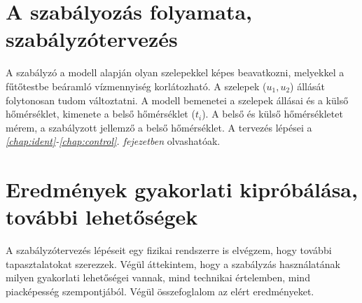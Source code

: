 \section{A szabályozás folyamata, szabályzótervezés}
A szabályzó a  modell alapján olyan szelepekkel képes beavatkozni, melyekkel a fűtőtestbe beáramló vízmennyiség  korlátozható. A szelepek ($u_1, u_2$) állását folytonosan tudom változtatni. A modell bemenetei a szelepek állásai és a külső hőmérséklet, kimenete a belső hőmérséklet ($t_i$).  A belső és külső hőmérsékletet mérem, a szabályzott jellemző a belső hőmérséklet.
%
A tervezés lépései a \textit{\ref{chap:ident}-\ref{chap:control}. fejezetben} olvashatóak.
%
%
%
\section{Eredmények gyakorlati kipróbálása, további lehetőségek}
%
A szabályzótervezés lépéseit egy fizikai rendszerre is elvégzem, hogy további tapasztalatokat szerezzek. Végül áttekintem, hogy a szabályzás használatának milyen gyakorlati lehetőségei vannak, mind technikai értelemben, mind piacképesség szempontjából. Végül összefoglalom az elért eredményeket.












